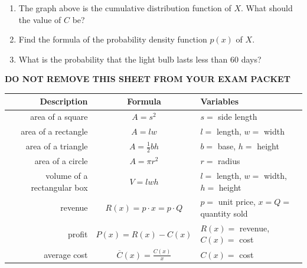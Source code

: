 \documentclass[11pt]{article}
\begin{document}
\begin{enumerate}
\begin{center}
\begin{tikzpicture}[scale=1.25]
    \end{tikzpicture}
    \end{center}

\begin{enumerate}
    \item The graph above is the cumulative distribution function of $X$. What should the value of $C$ be?

    \vfill

    \item Find the formula of the probability density function $p(x)$ of $X$.

    \vfill

    \item What is the probability that the light bulb lasts less than 60 days?

    \vfill
\end{enumerate}




\newpage

\begin{center}
{\bf DO NOT REMOVE THIS SHEET FROM YOUR EXAM PACKET}
\end{center}

\begin{center}
    \begin{tabular}{ r | c | l }
    {\bf Description} & {\bf Formula} & {\bf Variables}\\
    \hline
    area of a square & $A=s^2$ & $s=$ side length\\
    \hline
    area of a rectangle & $A=lw$ & $l=$ length, $w=$ width\\
    \hline
    area of a triangle & $A=\frac12bh$ & $b=$ base, $h=$ height\\
    \hline
    area of a circle & $A=\pi r^2$ & $r=$ radius\\
    \hline
    volume of a rectangular box & $V=lwh$ & $l=$ length, $w=$ width, $h=$ height\\
    \hline
    revenue & $R(x) = p\cdot x = p\cdot Q$ & $p=$ unit price, $x=Q=$ quantity sold\\
    \hline
    profit & $P(x) = R(x) - C(x)$ & $R(x)=$ revenue, $C(x)=$ cost\\
    \hline
    average cost & $\overline C(x) = \frac{C(x)}{x}$ & $C(x)=$ cost\\
    \end{tabular}
\end{center}


\end{enumerate}
\end{document}

